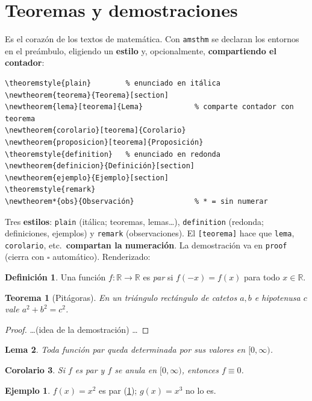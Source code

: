 \documentclass[11pt,a4paper]{article}
\newcommand{\R}{\mathbb{R}}  \newcommand{\N}{\mathbb{N}}
\theoremstyle{plain}      %
\newtheorem{teorema}{Teorema}[section]
\newtheorem{lema}[teorema]{Lema}              %
\newtheorem{corolario}[teorema]{Corolario}
\theoremstyle{definition} %
\newtheorem{definicion}{Definición}[section]
\newtheorem{ejemplo}{Ejemplo}[section]
\theoremstyle{remark}
\begin{document}
\section{Teoremas y demostraciones}
Es el corazón de los textos de matemática. Con \texttt{amsthm} se declaran los
entornos en el preámbulo, eligiendo un \textbf{estilo} y, opcionalmente,
\textbf{compartiendo el contador}:
\begin{lstlisting}
\theoremstyle{plain}        % enunciado en itálica
\newtheorem{teorema}{Teorema}[section]
\newtheorem{lema}[teorema]{Lema}            % comparte contador con teorema
\newtheorem{corolario}[teorema]{Corolario}
\newtheorem{proposicion}[teorema]{Proposición}
\theoremstyle{definition}   % enunciado en redonda
\newtheorem{definicion}{Definición}[section]
\newtheorem{ejemplo}{Ejemplo}[section]
\theoremstyle{remark}
\newtheorem*{obs}{Observación}              % * = sin numerar
\end{lstlisting}
Tres \textbf{estilos}: \texttt{plain} (itálica; teoremas, lemas\dots),
\texttt{definition} (redonda; definiciones, ejemplos) y \texttt{remark}
(observaciones). El \verb|[teorema]| hace que \texttt{lema}, \texttt{corolario},
etc.\ \textbf{compartan la numeración}. La demostración va en \texttt{proof}
(cierra con $\square$ automático). Renderizado:

\begin{definicion}\label{def:par}
Una función $f:\R\to\R$ es \emph{par} si $f(-x)=f(x)$ para todo $x\in\R$.
\end{definicion}

\begin{teorema}[Pitágoras]\label{thm:pit}
En un triángulo rectángulo de catetos $a,b$ e hipotenusa $c$ vale $a^2+b^2=c^2$.
\end{teorema}
\begin{proof}
\dots (idea de la demostración) \dots
\end{proof}

\begin{lema}
Toda función par queda determinada por sus valores en $[0,\infty)$.
\end{lema}
\begin{corolario}
Si $f$ es par y $f$ se anula en $[0,\infty)$, entonces $f\equiv 0$.
\end{corolario}
\begin{ejemplo}
$f(x)=x^2$ es par (\cref{def:par}); $g(x)=x^3$ no lo es.
\end{ejemplo}
\end{document}
